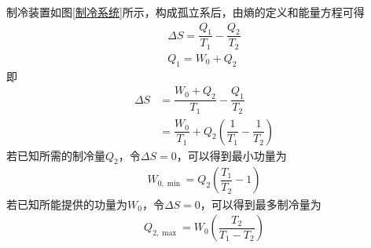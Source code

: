 \example[制冷系统]
制冷装置如图\ref{制冷系统}所示，构成孤立系后，由熵的定义和能量方程可得
\begin{align*}
		\Delta S = \dfrac{Q_1}{T_1} - \dfrac{Q_2}{T_2}\\[0.5em]
		Q_1 = W_0 + Q_2
\end{align*}
即
\begin{align*}
	\Delta S & = \dfrac{W_0 + Q_2}{T_1} - \dfrac{Q_1}{T_2}\\[0.5em]
	& = \dfrac{W_0}{T_1} + Q_2\left(\dfrac{1}{T_1} - \dfrac{1}{T_2} \right)
\end{align*}
若已知所需的制冷量$Q_2$，令$\Delta S = 0$，可以得到最小功量为
\begin{align}
	W_{0, \min} = Q_2 \left(\dfrac{T_1}{T_2} - 1\right)
\end{align}
若已知所能提供的功量为$W_0$，令$\Delta S = 0$，可以得到最多制冷量为
\begin{align}
	Q_{2, \max} = W_0\left(\dfrac{T_2}{T_1 - T_2} \right)
\end{align}
\vspace*{1em}

